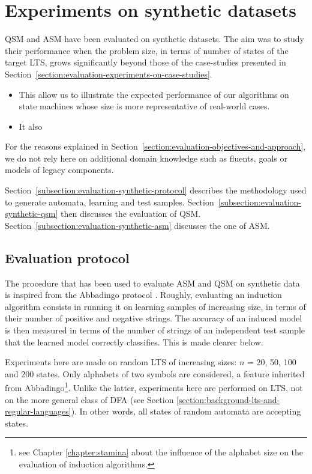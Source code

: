 \section{Experiments on synthetic datasets\label{section:evaluation-experiments-on-synthetic-data}}

QSM and ASM have been evaluated on synthetic datasets. The aim was to study their performance when the problem size, in terms of number of states of the target LTS, grows significantly beyond those of the case-studies presented in Section~\ref{section:evaluation-experiments-on-case-studies}. 
\begin{itemize}
\item This allow us to illustrate the expected performance of our algorithms on state machines whose size is more representative of real-world cases. 
\item It also 
\end{itemize}

For the reasons explained in Section~\ref{section:evaluation-objectives-and-approach}, we do not rely here on additional domain knowledge such as fluents, goals or models of legacy components.

Section~\ref{subsection:evaluation-synthetic-protocol} describes the methodology used to generate automata, learning and test samples. Section~\ref{subsection:evaluation-synthetic-qsm} then discusses the evaluation of QSM. Section~\ref{subsection:evaluation-synthetic-asm} discusses the one of ASM.

\subsection{Evaluation protocol\label{subsection:evaluation-synthetic-protocol}}

The procedure that has been used to evaluate ASM and QSM on synthetic data is inspired from the Abbadingo protocol \cite{Lang:1998}. Roughly, evaluating an induction algorithm consists in running it on learning samples of increasing size, in terms of their number of positive and negative strings. The accuracy of an induced model is then measured in terms of the number of strings of an independent test sample that the learned model correctly classifies. This is made clearer below.

Experiments here are made on random LTS of increasing sizes: $n$ = 20, 50, 100 and 200 states. Only alphabets of two symbols are considered, a feature inherited from Abbadingo\footnote{see Chapter \ref{chapter:stamina} about the influence of the alphabet size on the evaluation of induction algorithms.}. Unlike the latter, experiments here are performed on LTS, not on the more general class of DFA (see Section \ref{section:background-lts-and-regular-languages}). In other words, all states of random automata are accepting states.

